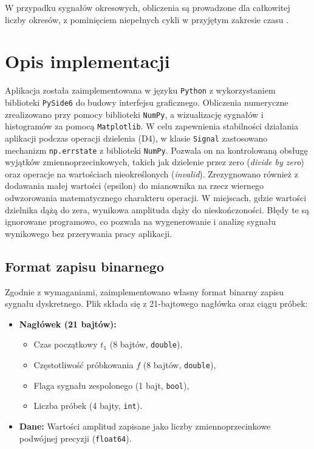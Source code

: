 \documentclass[12pt]{article}
\begin{document}
W przypadku sygnałów okresowych, obliczenia są prowadzone dla całkowitej liczby okresów, z pominięciem niepełnych cykli w przyjętym zakresie czasu \cite{1}.

\section{Opis implementacji}
Aplikacja została zaimplementowana w języku \texttt{Python} z wykorzystaniem biblioteki \texttt{PySide6} do budowy interfejsu graficznego. Obliczenia numeryczne zrealizowano przy pomocy biblioteki \texttt{NumPy}, a wizualizację sygnałów i histogramów za pomocą \texttt{Matplotlib}. W celu zapewnienia stabilności działania aplikacji podczas operacji dzielenia (D4), w klasie \texttt{Signal} zastosowano mechanizm \texttt{np.errstate} z biblioteki \texttt{NumPy}. Pozwala on na kontrolowaną obsługę wyjątków zmiennoprzecinkowych, takich jak dzielenie przez zero (\textit{divide by zero}) oraz operacje na wartościach nieokreślonych (\textit{invalid}). Zrezygnowano również z dodawania małej wartości (epsilon) do mianownika na rzecz wiernego odwzorowania matematycznego charakteru operacji. W miejscach, gdzie wartości dzielnika dążą do zera, wynikowa amplituda dąży do nieskończoności. Błędy te są ignorowane programowo, co pozwala na wygenerowanie i analizę sygnału wynikowego bez przerywania pracy aplikacji.

\subsection{Format zapisu binarnego}
Zgodnie z wymaganiami, zaimplementowano własny format binarny zapisu sygnału dyskretnego. Plik składa się z 21-bajtowego nagłówka oraz ciągu próbek:
\begin{itemize}
    \item \textbf{Nagłówek (21 bajtów):}
    \begin{itemize}
        \item Czas początkowy $t_1$ (8 bajtów, \texttt{double}),
        \item Częstotliwość próbkowania $f$ (8 bajtów, \texttt{double}),
        \item Flaga sygnału zespolonego (1 bajt, \texttt{bool}),
        \item Liczba próbek (4 bajty, \texttt{int}).
    \end{itemize}
    \item \textbf{Dane:} Wartości amplitud zapisane jako liczby zmiennoprzecinkowe podwójnej precyzji (\texttt{float64}).
\end{itemize}
\end{document}
